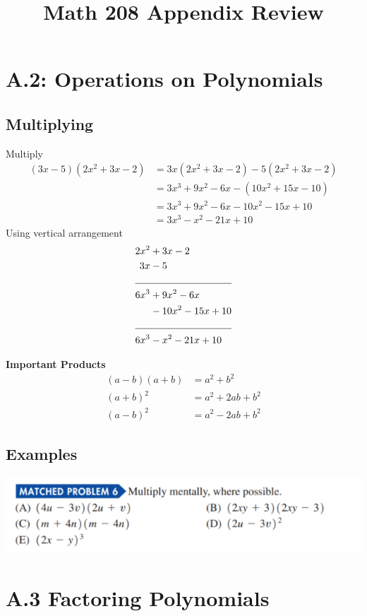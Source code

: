 \documentclass[14pt]{extarticle}
\title{\vspace{-5ex}Math 208 Appendix Review}
\date{\vspace{-10ex}}
\begin{document}
	\maketitle	

\section{A.2: Operations on Polynomials}
\subsection{Multiplying}
Multiply
\begin{align*}
	(3x-5)(2x^2 +3x - 2) &= 3x(2x^2 +3x - 2) - 5(2x^2 +3x - 2) \\
	&= 3x^3 + 9x^2 - 6x -(10x^2 + 15x -10) \\
	&= 3x^3 + 9x^2 - 6x -10x^2 - 15x +10 \\
	&= 3x^3 - x^2 -21x+10
\end{align*}
Using vertical arrangement
\begin{align*}
	2x^2 &+ 3x - 2\\
	3x &-5\\
	\cline{1-2} 
	6x^3 &+ 9x^2 - 6x \\
	&- 10x^2 - 15x +10 \\
	\cline{1-2}
	6x^3 &- x^2 -21x +10
\end{align*}
\begin{tcolorbox}[enhanced jigsaw,colback=bg,boxrule=0pt,arc=0pt]
	\textbf{Important Products}
	\begin{align}
		(a-b)(a+b)&=a^2+b^2 \\
		(a+b)^2 &= a^2 +2ab + b^2 \\
		(a-b)^2 &= a^2 - 2ab +b^2
	\end{align}
\end{tcolorbox}
\subsection{Examples}
\begin{center}
	\includegraphics[width=0.9\linewidth]{a-2-1}
\end{center}

\section{A.3 Factoring Polynomials}
\end{document}
